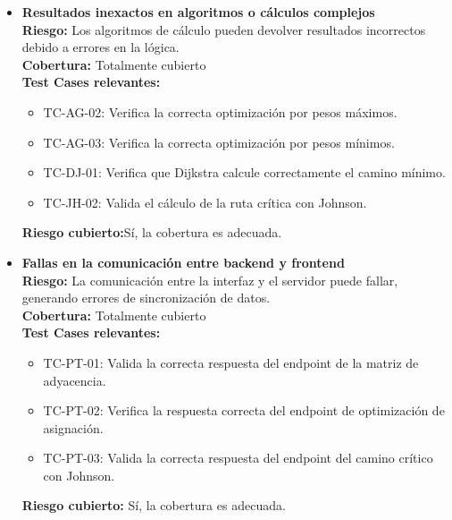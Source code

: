 \documentclass[stu, 12pt, letterpaper, donotrepeattitle, floatsintext, natbib]{apa7}
\begin{document}
\begin{itemize}
    \item \textbf{Resultados inexactos en algoritmos o cálculos complejos} \\ 
    \textbf{Riesgo:} Los algoritmos de cálculo pueden devolver resultados incorrectos debido a errores en la lógica. \\ 
    \textbf{Cobertura:} Totalmente cubierto \\ 
    \textbf{Test Cases relevantes:} 
    \begin{itemize}
      \item TC-AG-02: Verifica la correcta optimización por pesos máximos.
      \item TC-AG-03: Verifica la correcta optimización por pesos mínimos.
      \item TC-DJ-01: Verifica que Dijkstra calcule correctamente el camino mínimo.
      \item TC-JH-02: Valida el cálculo de la ruta crítica con Johnson.
    \end{itemize}
    \textbf{Riesgo cubierto:}Sí, la cobertura es adecuada.
  
    \item \textbf{Fallas en la comunicación entre backend y frontend} \\ 
    \textbf{Riesgo:} La comunicación entre la interfaz y el servidor puede fallar, generando errores de sincronización de datos. \\ 
    \textbf{Cobertura:} Totalmente cubierto \\ 
    \textbf{Test Cases relevantes:} 
    \begin{itemize}
      \item TC-PT-01: Valida la correcta respuesta del endpoint de la matriz de adyacencia.
      \item TC-PT-02: Verifica la respuesta correcta del endpoint de optimización de asignación.
      \item TC-PT-03: Valida la correcta respuesta del endpoint del camino crítico con Johnson.
    \end{itemize}
    \textbf{Riesgo cubierto:} Sí, la cobertura es adecuada.
  

\end{itemize}
\end{document}
